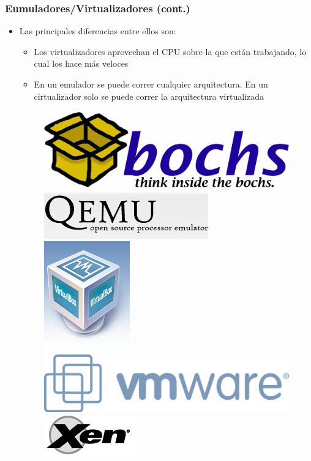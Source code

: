 \begin{frame}
	\frametitle{Eumuladores/Virtualizadores (cont.)}
	\begin{itemize}
		\item Las principales diferencias entre ellos son:
		\begin{itemize}
			\item Los virtualizadores aprovechan el CPU sobre la que están trabajando, lo cual los hace más veloces
			\item En un emulador se puede correr cualquier arquitectura. En un cirtualizador solo se puede correr la arquitectura virtualizada
		\end{itemize}
		\begin{figure}[h]
			\includegraphics[scale=0.2]{images/bochs.png}
			\hspace{30px}
			\includegraphics[scale=0.2]{images/quemu.png}
			\hspace{30px}
			\includegraphics[scale=0.2]{images/virtualbox.png}
			\hspace{30px}
			\includegraphics[scale=0.2]{images/vmware.png}
			\hspace{30px}
			\includegraphics[scale=0.2]{images/xen.png}
		\end{figure}		
	\end{itemize}
\end{frame}

